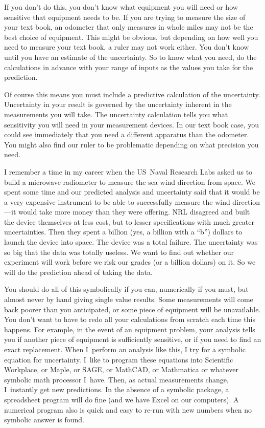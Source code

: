 \documentclass[twoside,11pt,ShortChapTitles]{BYUTextbook}
\begin{document}
If you don't do this, you don't know what equipment you will need or how
sensitive that equipment needs to be. If you are trying to measure the size
of your text book, an odometer that only measures in whole miles may not be
the best choice of equipment. This might be obvious, but depending on how
well you need to measure your text book, a ruler may not work either. You
don't know until you have an estimate of the uncertainty. So to know what
you need, do the calculations in advance with your range of inputs as the
values you take for the prediction.

Of course this means you must include a predictive calculation of the
uncertainty. Uncertainty in your result is governed by the uncertainty
inherent in the measurements you will take. The uncertainty calculation
tells you what sensitivity you will need in your measurement devices. In our
text book case, you could see immediately that you need a different
apparatus than the odometer. You might also find our ruler to be problematic
depending on what precision you need.

I remember a time in my career when the US\ Naval Research Labs asked us to
build a microwave radiometer to measure the sea wind direction from space.
We spent some time and our predicted analysis and uncertainty said that it
would be a very expensive instrument to be able to successfully measure the
wind direction---it would take more money than they were offering. NRL
disagreed and built the device themselves at less cost, but to lesser
specifications with much greater uncertainties. Then they spent a billion
(yes, a billion with a \textquotedblleft b\textquotedblright ) dollars to
launch the device into space. The device was a total failure. The
uncertainty was so big that the data was totally useless. We want to find
out whether our experiment will work before we risk our grades (or a billion
dollars) on it. So we will do the prediction ahead of taking the data.

You should do all of this symbolically if you can, numerically if you must,
but almost never by hand giving single value results. Some measurements will
come back poorer than you anticipated, or some piece of equipment will be
unavailable. You don't want to have to redo all your calculations from
scratch each time this happens. For example, in the event of an equipment
problem, your analysis tells you if another piece of equipment is
sufficiently sensitive, or if you need to find an exact replacement. When I\
perform an analysis like this, I try for a symbolic equation for
uncertainty. I\ like to program these equations into Scientific Workplace,
or Maple, or SAGE, or MathCAD, or Mathmatica or whatever symbolic math
processor I\ have. Then, as actual measurements change, I\ instantly get new
predictions. In the absence of a symbolic package, a spreadsheet program
will do fine (and we have Excel on our computers). A numerical program also
is quick and easy to re-run with new numbers when no symbolic answer is
found.
\end{document}
